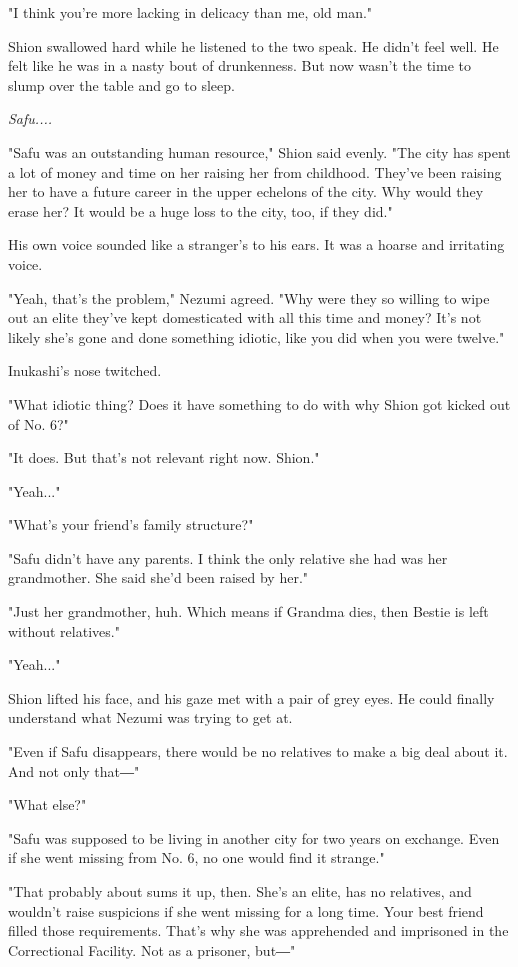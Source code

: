"I think you're more lacking in delicacy than me, old man."

Shion swallowed hard while he listened to the two speak. He didn't feel
well. He felt like he was in a nasty bout of drunkenness. But now wasn't
the time to slump over the table and go to sleep.

\emph{Safu....}

"Safu was an outstanding human resource," Shion said evenly. "The city
has spent a lot of money and time on her raising her from childhood.
They've been raising her to have a future career in the upper echelons
of the city. Why would they erase her? It would be a huge loss to the
city, too, if they did."

His own voice sounded like a stranger's to his ears. It was a hoarse and
irritating voice.

"Yeah, that's the problem," Nezumi agreed. "Why were they so willing to
wipe out an elite they've kept domesticated with all this time and
money? It's not likely she's gone and done something idiotic, like you
did when you were twelve."

Inukashi's nose twitched.

"What idiotic thing? Does it have something to do with why Shion got
kicked out of No. 6?"

"It does. But that's not relevant right now. Shion."

"Yeah..."

"What's your friend's family structure?"

"Safu didn't have any parents. I think the only relative she had was her
grandmother. She said she'd been raised by her."

"Just her grandmother, huh. Which means if Grandma dies, then Bestie is
left without relatives."

"Yeah..."

Shion lifted his face, and his gaze met with a pair of grey eyes. He
could finally understand what Nezumi was trying to get at.

"Even if Safu disappears, there would be no relatives to make a big deal
about it. And not only that―"

"What else?"

"Safu was supposed to be living in another city for two years on
exchange. Even if she went missing from No. 6, no one would find it
strange."

"That probably about sums it up, then. She's an elite, has no relatives,
and wouldn't raise suspicions if she went missing for a long time. Your
best friend filled those requirements. That's why she was apprehended
and imprisoned in the Correctional Facility. Not as a prisoner, but―"

